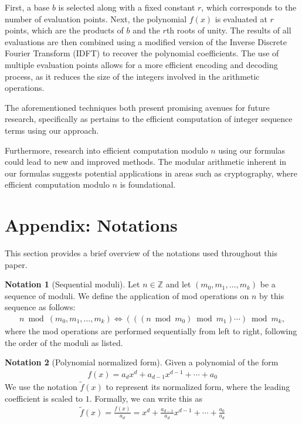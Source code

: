 \documentclass[11pt,reqno]{article}
\theoremstyle{plain}
\theoremstyle{definition}
\newtheorem{notation}{Notation}
\begin{document}
First, a base $b$ is selected along with a fixed constant $r$, which corresponds to the number of evaluation points. Next, the polynomial $f(x)$ is evaluated at $r$ points, which are the products of $b$ and the $r$th roots of unity. The results of all evaluations are then combined using a modified version of the Inverse Discrete Fourier Transform (IDFT) to recover the polynomial coefficients. The use of multiple evaluation points allows for a more efficient encoding and decoding process, as it reduces the size of the integers involved in the arithmetic operations.

The aforementioned techniques both present promising avenues for future research, specifically as pertains to the efficient computation of integer sequence terms using our approach.

Furthermore, research into efficient computation modulo $n$ using our formulas could lead to new and improved methods. The modular arithmetic inherent in our formulas suggests potential applications in areas such as cryptography, where efficient computation modulo $n$ is foundational.

\section{Appendix: Notations} \label{section:notations}
This section provides a brief overview of the notations used throughout this paper.

\begin{notation}[Sequential moduli]
Let $n \in \mathbb{Z}$ and let $(m_0, m_1, \ldots, m_k)$ be a sequence of moduli. We define the application of mod operations on $n$ by this sequence as follows:
\begin{align*}
    n \bmod{(m_0, m_1, \ldots, m_k)} \Longleftrightarrow  (((n \bmod{m_0}) \bmod{m_1}) \cdots ) \bmod{m_k},
\end{align*}
where the mod operations are performed sequentially from left to right, following the order of the moduli as listed.
\end{notation}

\begin{notation}[Polynomial normalized form]

Given a polynomial of the form
\begin{align*}
f(x) = a_d x^d + a_{d-1} x^{d-1} + \cdots + a_0
\end{align*}
We use the notation $\tilde{f}(x)$ to represent its normalized form, where the leading coefficient is scaled to $1$. Formally, we can write this as
\begin{align*}
    \tilde{f}(x) = \frac{f(x)}{a_d} = x^d + \frac{a_{d-1}}{a_d} x^{d-1} + \cdots + \frac{a_0}{a_d}
\end{align*}
\end{notation}
\end{document}
